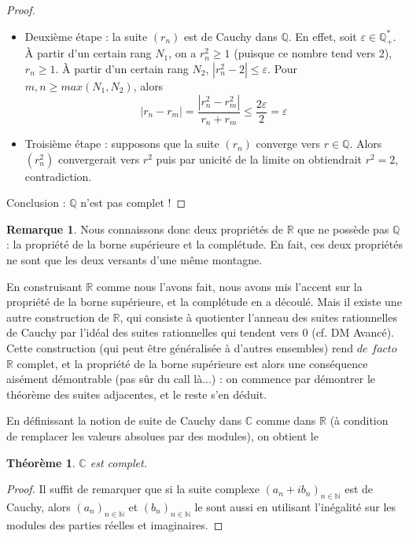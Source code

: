 \documentclass[french]{book}
\newcommand{\N}{\mathbb{N}}
\newcommand{\Q}{\mathbb{Q}}
\newcommand{\R}{\mathbb{R}}
\newcommand{\C}{\mathbb{C}}
\theoremstyle{plain}
\newtheorem{thm}{Théorème}[chapter]
\theoremstyle{definition}
\newtheorem{rmq}{Remarque}[chapter]
\theoremstyle{remark}
\begin{document}
\begin{proof}
\begin{itemize}
\begin{itemize}
\begin{itemize}
			\item[*] Enfin, on a \begin{align*}
				p_{n+1}^2 - 2q_{n+1}^2 = (p_n + 2q_n)^2 - 2(p_n + q_n)^2 &= -p_n^2 + 2q_n^2\\
				&= -(-1)^n\\
				&= (-1)^{n+1}
			\end{align*}
		\end{itemize}
	\end{itemize}
	On en déduit $\forall n > 0$, $q_n \neq 0$ et $\displaystyle\frac{p_n^2}{q_n^2} = 2 + \frac{(-1)^n}{q_n^2}$ Or $\displaystyle\left\lvert\frac{(-1)^n}{q_n^2}\right\rvert = \frac{1}{q_n^2} \leqslant \frac{1}{n^2} \leqslant \frac{1}{2^n} \rightarrow 0$. Donc $\frac{p_n^2}{q_n^2} \rightarrow 2$
	\item Deuxième étape : la suite $(r_n)$ est de Cauchy dans $\mathbb{Q}$. En effet, soit $\varepsilon \in \mathbb{Q}_{+}^{*}$. À partir d'un certain rang $N_1$, on a $r_n^2 \geqslant 1$ (puisque ce nombre tend vers 2), $r_n \geqslant 1$. À partir d'un certain rang $N_2$, $|r_n^2 - 2| \leqslant \varepsilon$. Pour $m, n \geqslant max(N_1, N_2)$, alors $$|r_n - r_m| = \frac{|r_n^2 - r_m^2|}{r_n + r_m} \leqslant \frac{2\varepsilon}{2} = \varepsilon$$
	\item Troisième étape : supposons que la suite $(r_n)$ converge vers $r \in \mathbb{Q}$. Alors $(r_n^2)$ convergerait vers $r^2$ puis par unicité de la limite on obtiendrait $r^2 = 2$, contradiction.
\end{itemize}
Conclusion : $\mathbb{Q}$ n'est pas complet !
\end{proof}
\begin{rmq}
	Nous connaissons donc deux propriétés de $\R$ que ne possède pas $\Q$ : la propriété de la borne supérieure et la complétude. En fait, ces deux propriétés ne sont que les deux versants d'une même montagne. \par En construisant $\R$ comme nous l'avons fait, nous avons mis l'accent sur la propriété de la borne supérieure, et la complétude en a découlé. Mais il existe une autre construction de $\R$, qui consiste à quotienter l'anneau des suites rationnelles de Cauchy par l'idéal des suites rationnelles qui tendent vers $0$ (cf. DM Avancé). Cette construction (qui peut être généralisée à d'autres ensembles) rend $de$ $facto$ $\R$ complet, et la propriété de la borne supérieure est alors une conséquence aisément démontrable (pas sûr du call là...) : on commence par démontrer le théorème des suites adjacentes, et le reste s'en déduit.
\end{rmq}
En définissant la notion de suite de Cauchy dans $\C$ comme dans $\R$ (à condition de remplacer les valeurs absolues par des modules), on obtient le 
\begin{thm}
	$\C$ est complet.
\end{thm}
\begin{proof}
	Il suffit de remarquer que si la suite complexe $(a_n+ib_n)_{n\in\N}$ est de Cauchy, alors $(a_n)_{n\in\N}$ et $(b_n)_{n\in\N}$ le sont aussi en utilisant l'inégalité sur les modules des parties réelles et imaginaires.
\end{proof}
\end{document}
